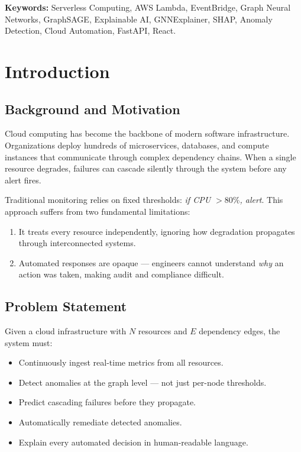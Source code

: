 \documentclass[12pt,a4paper]{report}
\begin{document}
\vspace{0.5cm}
\noindent\textbf{Keywords:} Serverless Computing, AWS Lambda, EventBridge,
Graph Neural Networks, GraphSAGE, Explainable AI, GNNExplainer, SHAP,
Anomaly Detection, Cloud Automation, FastAPI, React.

\tableofcontents
\listoffigures
\listoftables

\chapter{Introduction}

\section{Background and Motivation}

Cloud computing has become the backbone of modern software infrastructure.
Organizations deploy hundreds of microservices, databases, and compute
instances that communicate through complex dependency chains. When a single
resource degrades, failures can cascade silently through the system before
any alert fires.

Traditional monitoring relies on fixed thresholds: \emph{if CPU $> 80\%$,
alert}. This approach suffers from two fundamental limitations:
\begin{enumerate}
  \item It treats every resource independently, ignoring how degradation
        propagates through interconnected systems.
  \item Automated responses are opaque — engineers cannot understand
        \emph{why} an action was taken, making audit and compliance
        difficult.
\end{enumerate}

\section{Problem Statement}

Given a cloud infrastructure with $N$ resources and $E$ dependency edges,
the system must:
\begin{itemize}
  \item Continuously ingest real-time metrics from all resources.
  \item Detect anomalies at the graph level — not just per-node thresholds.
  \item Predict cascading failures before they propagate.
  \item Automatically remediate detected anomalies.
  \item Explain every automated decision in human-readable language.
\end{itemize}
\end{document}
